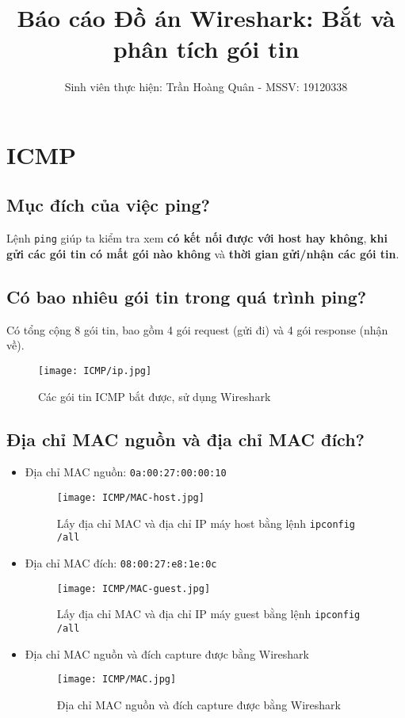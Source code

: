 \documentclass[]{article}
\title{Báo cáo Đồ án Wireshark: Bắt và phân tích gói tin}
\author{Sinh viên thực hiện: Trần Hoàng Quân - MSSV: 19120338}
\begin{document}
\maketitle
\tableofcontents
\pagebreak

\section{ICMP}
\subsection{Mục đích của việc ping?}
Lệnh \texttt{ping} giúp ta kiểm tra xem \textbf{có kết nối được với host hay không}, \textbf{khi gửi các gói tin có mất gói nào không} và \textbf{thời gian gửi/nhận các gói tin}.

\subsection{Có bao nhiêu gói tin trong quá trình ping?}
Có tổng cộng 8 gói tin, bao gồm 4 gói request (gửi đi) và 4 gói response (nhận về).
\begin{figure}[H]
\centering
\texttt{[image: ICMP/ip.jpg]}
\caption{Các gói tin ICMP bắt được, sử dụng Wireshark}
\end{figure}

\subsection{Địa chỉ MAC nguồn và địa chỉ MAC đích?}
\begin{itemize}
\item Địa chỉ MAC nguồn: \texttt{0a:00:27:00:00:10}
\begin{figure}[H]
\centering
\texttt{[image: ICMP/MAC-host.jpg]}
\caption{Lấy địa chỉ MAC và địa chỉ IP máy host bằng lệnh \texttt{ipconfig /all}}
\label{fig:macandiphost}
\end{figure}

\item Địa chỉ MAC đích: \texttt{08:00:27:e8:1e:0c}
\begin{figure}[H]
\centering
\texttt{[image: ICMP/MAC-guest.jpg]}
\caption{Lấy địa chỉ MAC và địa chỉ IP máy guest bằng lệnh \texttt{ipconfig /all}}
\label{fig:macandipguest}
\end{figure}

\item Địa chỉ MAC nguồn và đích capture được bằng Wireshark
\begin{figure}[H]
\centering
\texttt{[image: ICMP/MAC.jpg]}
\caption{Địa chỉ MAC nguồn và đích capture được bằng Wireshark}
\end{figure}
\end{itemize}
\end{document}

